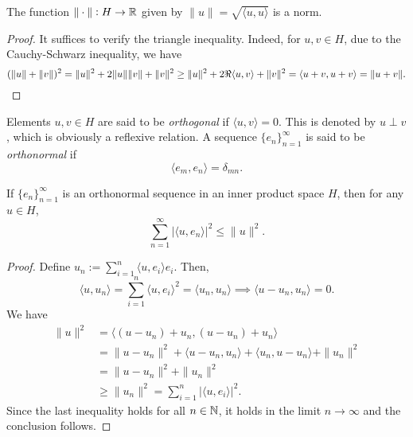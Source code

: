 \begin{proposition}
    The function $\|\cdot\|: H\to\mathbb{R}$ given by $\|u\| = \sqrt{\langle u,u\rangle}$ is a norm.
\end{proposition}
\begin{proof}
    It suffices to verify the triangle inequality. Indeed, for $u,v\in H$, due to the Cauchy-Schwarz inequality, we have 
    \begin{equation*}
        (\|u\| + \|v\|)^2 = \|u\|^2 + 2\|u\|\|v\| + \|v\|^2\ge \|u\|^2 + 2\Re\langle u,v\rangle + \|v\|^2 = \langle u + v, u + v\rangle = \|u + v\|.\qedhere
    \end{equation*}
\end{proof}

\begin{definition}
    Elements $u,v\in H$ are said to be \emph{orthogonal} if $\langle u,v\rangle = 0$. This is denoted by $u\perp v$, which is obviously a reflexive relation. A sequence $\{e_n\}_{n = 1}^\infty$ is said to be \emph{orthonormal} if 
    \begin{equation*}
        \langle e_m, e_n\rangle = \delta_{mn}.
    \end{equation*}
\end{definition}

\begin{theorem}
    If $\{e_n\}_{n = 1}^\infty$ is an orthonormal sequence in an inner product space $H$, then for any $u\in H$, 
    \begin{equation*}
        \sum_{n = 1}^\infty |\langle u, e_n\rangle|^2\le \|u\|^2.
    \end{equation*}
\end{theorem}
\begin{proof}
    Define $\displaystyle u_n := \sum_{i = 1}^n \langle u, e_i\rangle e_i$. Then, 
    \begin{equation*}
        \langle u, u_n\rangle = \sum_{i = 1}^n\langle u, e_i\rangle^2 = \langle u_n,u_n\rangle\implies \langle u - u_n, u_n\rangle = 0.
    \end{equation*}
    We have 
    \begin{align*}
        \|u\|^2 &= \langle (u - u_n) + u_n, (u - u_n) + u_n\rangle\\
        &= \|u - u_n\|^2 + \langle u - u_n, u_n\rangle + \langle u_n, u - u_n\rangle + \|u_n\|^2\\
        &= \|u - u_n\|^2 + \|u_n\|^2\\
        &\ge\|u_n\|^2 = \sum_{i = 1}^n|\langle u, e_i\rangle|^2.
    \end{align*}
    Since the last inequality holds for all $n\in\mathbb{N}$, it holds in the limit $n\to\infty$ and the conclusion follows.
\end{proof}

